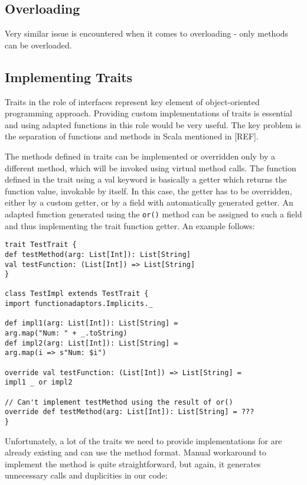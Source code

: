 
\subsection{Overloading}
Very similar issue is encountered when it comes to overloading - only methods can be overloaded.

\subsection{Implementing Traits}
Traits in the role of interfaces represent key element of object-oriented programming approach. Providing custom implementations of traits is essential and using adapted functions in this role would be very useful. The key problem is the separation of functions and methods in Scala mentioned in [REF].

The methods defined in traits can be implemented or overridden only by a different method, which will be invoked using virtual method calls. The function defined in the trait using a val keyword is basically a getter which returns the function value, invokable by itself. In this case, the getter has to be overridden, either by a custom getter, or by a field with automatically generated getter. An adapted function generated using the \lstinline|or()| method can be assigned to such a field and thus implementing the trait function getter. An example follows:

\lstset{style=Scala}
\begin{lstlisting}
trait TestTrait {
def testMethod(arg: List[Int]): List[String]
val testFunction: (List[Int]) => List[String]
}

class TestImpl extends TestTrait {
import functionadaptors.Implicits._

def impl1(arg: List[Int]): List[String] = 
arg.map("Num: " + _.toString)
def impl2(arg: List[Int]): List[String] = 
arg.map(i => s"Num: $i")

override val testFunction: (List[Int]) => List[String] = 
impl1 _ or impl2

// Can't implement testMethod using the result of or()
override def testMethod(arg: List[Int]): List[String] = ???
}
\end{lstlisting}

Unfortunately, a lot of the traits we need to provide implementations for are already existing and can use the method format. Manual workaround to implement the method is quite straightforward, but again, it generates unnecessary calls and duplicities in our code:

